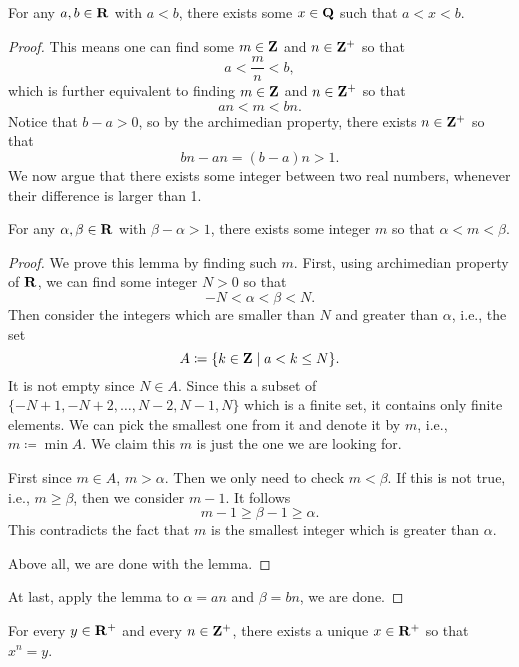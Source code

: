 
\begin{theorem}[$\QQ$ is dense in $\RR$]
For any $a,b\in\mathbf R$ with $a<b$, there exists some $x\in\mathbf Q$ such that $a<x<b$.
\end{theorem}

\begin{proof}
This means one can find some $m\in\mathbf Z$ and $n\in\mathbf Z^+$ so that
\[a<\frac{m}{n}<b,\]
which is further equivalent to finding $m\in\mathbf Z$ and $n\in\mathbf Z^+$ so that
\[an<m<bn.\]
Notice that $b-a>0$, so by the archimedian property, there exists $n\in\mathbf Z^+$ so that
\[bn-an=(b-a)n>1.\]
We now argue that there exists some integer between two real numbers, whenever their difference is larger than 1.

\begin{lemma}
For any $\alpha,\beta\in\mathbf R$ with $\beta-\alpha>1$, there exists some integer $m$ so that $\alpha<m<\beta$.
\end{lemma}

\begin{proof}
We prove this lemma by finding such $m$. First, using archimedian property of $\RR$, we can find some integer $N>0$ so that
\[-N<\alpha<\beta<N.\]
Then consider the integers which are smaller than $N$ and greater than $\alpha$, i.e., the set
\[A\coloneqq\{k\in\mathbf Z\mid a<k\le N\}.\]
It is not empty since $N\in A$. Since this a subset of $\{-N+1,-N+2,\dots,N-2,N-1,N\}$ which is a finite set, it contains only finite elements. We can pick the smallest one from it and denote it by $m$, i.e., $m\coloneqq\min A$. We claim this $m$ is just the one we are looking for.

First since $m\in A$, $m>\alpha$. Then we only need to check $m<\beta$. If this is not true, i.e., $m\ge\beta$, then we consider $m-1$. It follows
\[m-1\ge\beta-1\ge\alpha.\]
This contradicts the fact that $m$ is the smallest integer which is greater than $\alpha$.

Above all, we are done with the lemma.
\end{proof}

At last, apply the lemma to $\alpha=an$ and $\beta=bn$, we are done.
\end{proof}

\begin{theorem}
For every $y\in\mathbf R^+$ and every $n\in\mathbf Z^+$, there exists a unique $x\in\mathbf R^+$ so that $x^n=y$.
\end{theorem}

